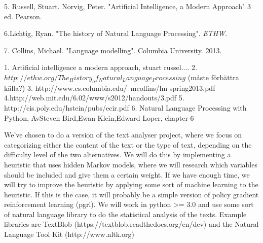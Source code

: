 \documentclass[a4paper]{article}
\begin{document}
5. Russell, Stuart. Norvig, Peter. "Artificial Intelligence, a Modern Approach" 3 ed. Pearson. 

6.Lichtig, Ryan. "The history of Natural Language Processing". \textit{ETHW}. 

7. Collins, Michael. "Language modelling". Columbia University. 2013.


1. Artificial intelligence a modern approach, stuart russel....
2. $http://ethw.org/The_History_of_Natural_Language_Processing$ (måste förbättra källa?)
3. http://www.cs.columbia.edu/~mcollins/lm-spring2013.pdf
4.http://web.mit.edu/6.02/www/s2012/handouts/3.pdf
5. http://cis.poly.edu/hstein/pubs/ecir.pdf
6. Natural Language Processing with Python, AvSteven Bird,Ewan Klein,Edward Loper, chapter 6


We've chosen to do a version of the text analyser project, where we focus on categorizing either the content of the text or the type of text, depending on the difficulty level of the two alternatives. We will do this by implementing a heuristic that uses hidden Markov models, where we will research which variables should be included and give them a certain weight. If we have enough time, we will try to improve the heuristic by applying some sort of machine learning to the heuristic. If this is the case, it will probably be a simple version of policy gradient reinforcement learning (pgrl). We will work in python \textgreater= 3.0 and use some sort of natural language library to do the statistical analysis of the texts. Example libraries are TextBlob (https://textblob.readthedocs.org/en/dev) and the Natural Language Tool Kit (http://www.nltk.org)
\newline
\end{document}
